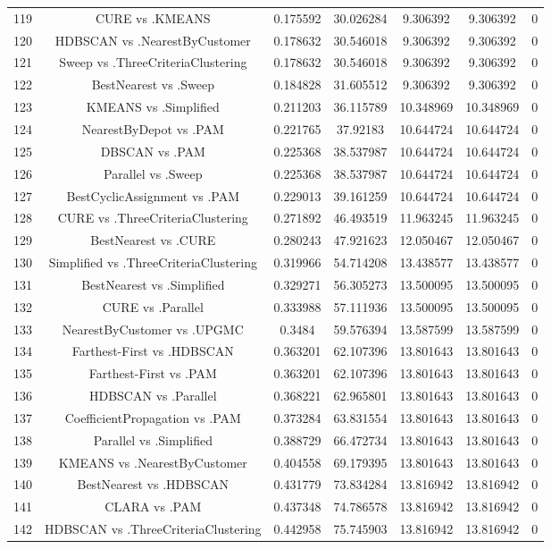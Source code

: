 \documentclass[a4paper,10pt]{article}
\begin{document}
\begin{landscape}
\begin{table}[!htp]
\begin{tabular}{ccccccc}
119&CURE vs .KMEANS&0.175592&30.026284&9.306392&9.306392&0\\
120&HDBSCAN vs .NearestByCustomer&0.178632&30.546018&9.306392&9.306392&0\\
121&Sweep vs .ThreeCriteriaClustering&0.178632&30.546018&9.306392&9.306392&0\\
122&BestNearest vs .Sweep&0.184828&31.605512&9.306392&9.306392&0\\
123&KMEANS vs .Simplified&0.211203&36.115789&10.348969&10.348969&0\\
124&NearestByDepot vs .PAM&0.221765&37.92183&10.644724&10.644724&0\\
125&DBSCAN vs .PAM&0.225368&38.537987&10.644724&10.644724&0\\
126&Parallel vs .Sweep&0.225368&38.537987&10.644724&10.644724&0\\
127&BestCyclicAssignment vs .PAM&0.229013&39.161259&10.644724&10.644724&0\\
128&CURE vs .ThreeCriteriaClustering&0.271892&46.493519&11.963245&11.963245&0\\
129&BestNearest vs .CURE&0.280243&47.921623&12.050467&12.050467&0\\
130&Simplified vs .ThreeCriteriaClustering&0.319966&54.714208&13.438577&13.438577&0\\
131&BestNearest vs .Simplified&0.329271&56.305273&13.500095&13.500095&0\\
132&CURE vs .Parallel&0.333988&57.111936&13.500095&13.500095&0\\
133&NearestByCustomer vs .UPGMC&0.3484&59.576394&13.587599&13.587599&0\\
134&Farthest-First vs .HDBSCAN&0.363201&62.107396&13.801643&13.801643&0\\
135&Farthest-First vs .PAM&0.363201&62.107396&13.801643&13.801643&0\\
136&HDBSCAN vs .Parallel&0.368221&62.965801&13.801643&13.801643&0\\
137&CoefficientPropagation vs .PAM&0.373284&63.831554&13.801643&13.801643&0\\
138&Parallel vs .Simplified&0.388729&66.472734&13.801643&13.801643&0\\
139&KMEANS vs .NearestByCustomer&0.404558&69.179395&13.801643&13.801643&0\\
140&BestNearest vs .HDBSCAN&0.431779&73.834284&13.816942&13.816942&0\\
141&CLARA vs .PAM&0.437348&74.786578&13.816942&13.816942&0\\
142&HDBSCAN vs .ThreeCriteriaClustering&0.442958&75.745903&13.816942&13.816942&0\\

\end{tabular}
\end{table}
\end{landscape}
\end{document}
